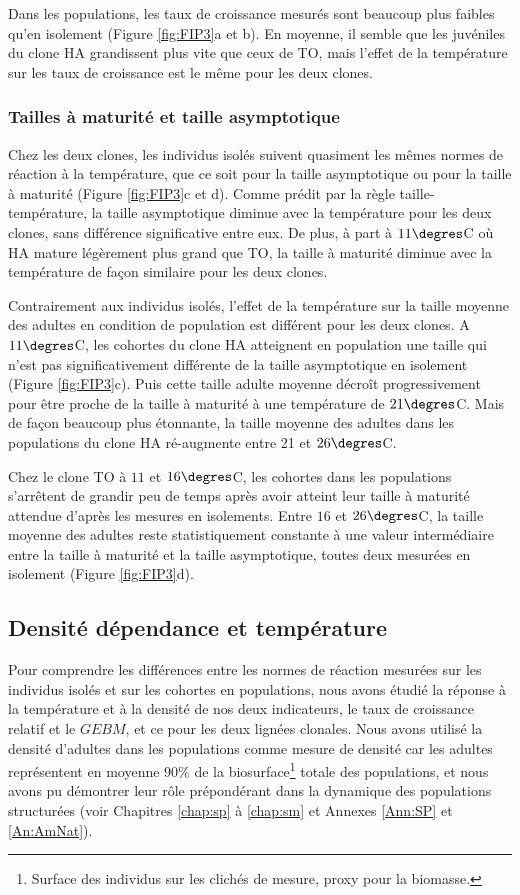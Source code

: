 Dans les populations, les taux de croissance mesurés sont beaucoup plus faibles
qu'en isolement (Figure \ref{fig:FIP3}a et b). En moyenne, il semble que les
juvéniles du clone HA grandissent plus vite que ceux de TO, mais l'effet de la
température sur les taux de croissance est le même pour les deux clones. 

\subsubsection{Tailles à maturité et taille asymptotique}

Chez les deux clones, les individus isolés suivent quasiment les mêmes normes de
réaction à la température, que ce soit pour la taille asymptotique ou pour la
taille à maturité (Figure \ref{fig:FIP3}c et d). Comme prédit par la règle
taille-température, la taille asymptotique diminue avec la température pour les
deux clones, sans différence significative entre eux. De plus, à part à
$11\degres$C où HA mature légèrement plus grand que TO, la taille à maturité
diminue avec la température de façon similaire pour les deux clones. 

Contrairement aux individus isolés, l'effet de la température sur la taille
moyenne des adultes en condition de population est différent pour les deux
clones. A $11\degres$C, les cohortes du clone HA atteignent en population une
taille qui n'est pas significativement différente de la taille asymptotique en
isolement (Figure \ref{fig:FIP3}c). Puis cette taille adulte moyenne décroît
progressivement pour être proche de la taille à maturité à une température de $21\degres$C. Mais de façon
beaucoup plus étonnante, la taille moyenne des adultes dans les populations du
clone HA ré-augmente entre 21 et $26\degres$C. 

Chez le clone TO à $11$ et $16\degres$C, les cohortes dans les populations
s'arrêtent de grandir peu de temps après avoir atteint leur taille à maturité
attendue d'après les mesures en isolements. Entre $16$ et $26\degres$C, la
taille moyenne des adultes reste statistiquement constante à une valeur intermédiaire
entre la taille à maturité et la taille asymptotique, toutes deux mesurées en
isolement (Figure \ref{fig:FIP3}d).

\subsection{Densité dépendance et température}

Pour comprendre les différences entre les normes de réaction mesurées sur les
individus isolés et sur les cohortes en populations, nous avons étudié la
réponse à la température et à la densité de nos deux indicateurs, le taux de
croissance relatif et le $GEBM$, et ce pour les deux lignées clonales. Nous
avons utilisé la densité d'adultes dans les populations comme mesure de densité
car les adultes représentent en moyenne $90\%$ de la
biosurface\footnote{Surface des individus sur les clichés de mesure, proxy pour
la biomasse.} totale des populations, et nous avons pu démontrer leur rôle
prépondérant dans la dynamique des populations structurées (voir Chapitres \ref{chap:sp} à \ref{chap:sm} et Annexes \ref{Ann:SP} et \ref{An:AmNat}).


